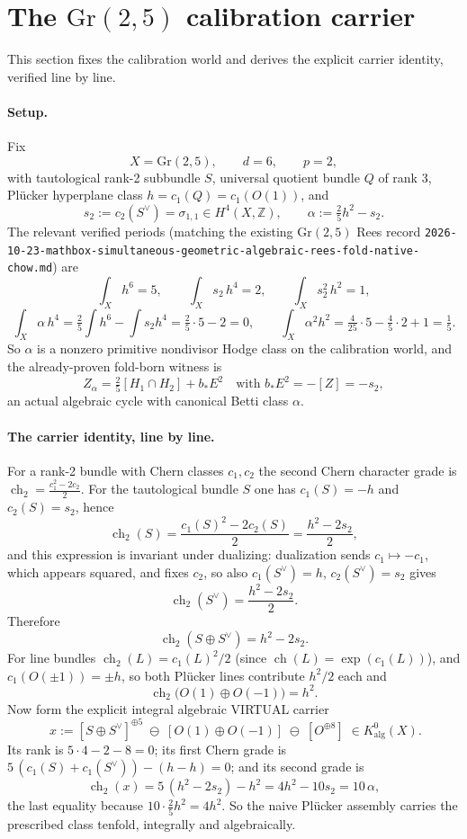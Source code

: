 \documentclass[11pt]{article}
\newcommand{\ch}{\operatorname{ch}}
\begin{document}
\section{The $\mathrm{Gr}(2,5)$ calibration carrier}
This section fixes the calibration world and derives the explicit
carrier identity, verified line by line.

\paragraph{Setup.}
Fix
\[
  X=\mathrm{Gr}(2,5),\qquad d=6,\qquad p=2,
\]
with tautological rank-2 subbundle $S$, universal quotient bundle $Q$
of rank 3, Pl\"ucker hyperplane class
$h=c_1(Q)=c_1(O(1))$, and
\[
  s_2:=c_2(S^\vee)=\sigma_{1,1}\in H^4(X,\mathbb Z),\qquad
  \alpha:=\tfrac25 h^2-s_2 .
\]
The relevant verified periods (matching the existing
$\mathrm{Gr}(2,5)$ Rees record
\texttt{2026-10-23-mathbox-simultaneous-geometric-algebraic-rees-fold-native-chow.md})
are
\[
  \int_X h^{6}=5,\qquad
  \int_X s_2\,h^{4}=2,\qquad
  \int_X s_2^2\,h^{2}=1,
\]
\[
  \int_X \alpha\,h^{4}
  =\tfrac25\int h^{6}-\int s_2h^{4}
  =\tfrac25\cdot 5-2=0,
  \qquad
  \int_X \alpha^2 h^{2}
  =\tfrac{4}{25}\cdot 5-\tfrac45\cdot 2+1
  =\tfrac15 .
\]
So $\alpha$ is a nonzero primitive nondivisor Hodge class on
the calibration world, and the already-proven fold-born witness is
\[
  Z_\alpha=\tfrac25[H_1\cap H_2]+b_*E^2
  \quad\text{with } b_*E^2=-[Z]=-s_2,
\]
an actual algebraic cycle with canonical Betti class $\alpha$.

\paragraph{The carrier identity, line by line.}
For a rank-2 bundle with Chern classes $c_1,c_2$ the second Chern
character grade is
$\ch_2=\frac{c_1^2-2c_2}{2}$.
For the tautological bundle $S$ one has $c_1(S)=-h$ and
$c_2(S)=s_2$, hence
\[
  \ch_2(S)=\frac{c_1(S)^2-2c_2(S)}{2}
         =\frac{h^2-2s_2}{2},
\]
and this expression is invariant under dualizing: dualization sends
$c_1\mapsto -c_1$, which appears squared, and fixes $c_2$, so also
$c_1(S^\vee)=h$, $c_2(S^\vee)=s_2$ gives
\[
  \ch_2(S^\vee)=\frac{h^2-2s_2}{2}.
\]
Therefore
\[
  \ch_2(S\oplus S^\vee)=h^2-2s_2 .
\]
For line bundles $\ch_2(L)=c_1(L)^2/2$ (since $\ch(L)=\exp(c_1(L))$),
and $c_1(O(\pm 1))=\pm h$, so both Pl\"ucker lines contribute
$h^2/2$ each and
\[
  \ch_2\bigl(O(1)\oplus O(-1)\bigr)=h^2 .
\]
Now form the explicit integral algebraic VIRTUAL carrier
\[
  \boxed{\;
  x:=[S\oplus S^\vee]^{\oplus 5}
     \;\ominus\;[O(1)\oplus O(-1)]
     \;\ominus\;[O^{\oplus 8}]\;\in K^0_{\mathrm{alg}}(X).}
\]
Its rank is $5\cdot 4-2-8=0$; its first Chern grade is
$5\,(c_1(S)+c_1(S^\vee))-(h-h)=0$; and its second grade is
\[
  \ch_2(x)=5\,(h^2-2s_2)-h^2=4h^2-10s_2=10\,\alpha,
\]
the last equality because $10\cdot\frac25 h^2=4h^2$.
So the naive Pl\"ucker assembly carries the prescribed class tenfold,
integrally and algebraically.
\end{document}
